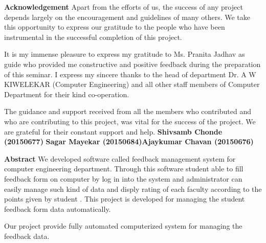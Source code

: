 \documentclass[12 pt,a4paper]{report}
\begin{document}
\newpage
\begin{center}
\textbf{Acknowledgement}
\justify
Apart from the efforts of us, the success of any project depends largely on the encouragement and guidelines of many others. We take this opportunity to express our gratitude to the people who have been instrumental in the successful completion of this project.\par
\justify
It is my immense pleasure to express my gratitude to Ms. Pranita Jadhav as guide who provided me constructive and positive feedback during the preparation of this seminar. I express my sincere thanks to the head of department Dr. A W KIWELEKAR (Computer Engineering) and all other staff members of Computer Department for their kind co-operation.\par 
\justify
The guidance and support received from all the members who contributed
and who are contributing to this project, was vital for the success of the project. 
We are grateful for their constant support and help.
\flushright \textbf{Shivsamb Chonde  (20150677)}
\flushright\textbf{Sagar Mayekar (20150684)}\flushright\textbf{Ajaykumar Chavan (20150676)}

\end{center}
\newpage
\begin{center}
\textbf{Abstract}
\justify
We developed software called feedback management system for computer engineering department. Through this software student able to fill feedback form on computer by log in into the system and administrator can easily manage such kind of data and disply rating of each faculty according to the points given by student .  
This project is developed for managing the student feedback form data automatically.\par
\justify
Our project provide fully automated computerized system for managing the feedback data.
\end{center}


\tableofcontents


\begin{center}
\listoffigures
\end{center}
\setcounter{page}{1}
\end{document}
